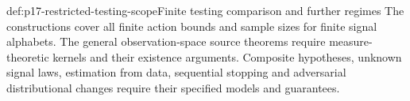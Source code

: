 \begin{proofboundary}{def:p17-restricted-testing-scope}{Finite testing comparison and further regimes}
The constructions cover all finite action bounds and sample sizes for
finite signal alphabets. The general observation-space source theorems
require measure-theoretic kernels and their existence arguments.
Composite hypotheses, unknown signal laws, estimation from data, sequential
stopping and adversarial distributional changes require their specified
models and guarantees.
\end{proofboundary}
